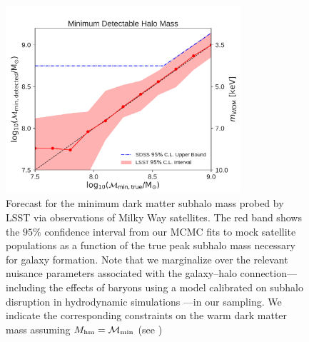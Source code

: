\begin{figure}[t]
\centering
\includegraphics[width=0.775\textwidth]{figures/LSST_Mmin.pdf}
\caption{Forecast for the minimum dark matter subhalo mass probed by LSST via observations of Milky Way satellites. The red band shows the $95\%$ confidence interval from our MCMC fits to mock satellite populations as a function of the true peak subhalo mass necessary for galaxy formation. Note that we marginalize over the relevant nuisance parameters associated with the galaxy--halo connection---including the effects of baryons using a model calibrated on subhalo disruption in hydrodynamic simulations \citep{2018ApJ...859..129N}---in our sampling. We indicate the corresponding constraints on the warm dark matter mass assuming $M_{\rm hm} = \mathcal{M}_{\rm{min}}$ (see )}\label{fig:satellite_mmin}
\end{figure}

